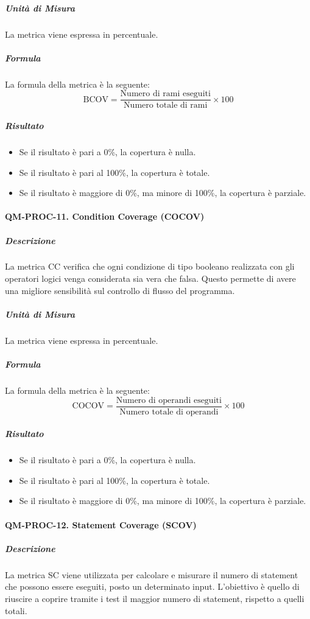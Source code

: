 				\subparagraph{Unità di Misura}
				La metrica viene espressa in percentuale.

				\subparagraph{Formula}
				La formula della metrica è la seguente:
				\[
					\text{BCOV} = \frac{\text{Numero di rami eseguiti}}{\text{Numero totale di rami}} \times 100
				\]

				\subparagraph{Risultato}
				\begin{itemize}
					\item Se il risultato è pari a 0\%, la copertura è nulla.
					\item Se il risultato è pari al 100\%, la copertura è totale.
					\item Se il risultato è maggiore di 0\%, ma minore di 100\%, la copertura è parziale.
				\end{itemize}

			\paragraph{QM-PROC-11. Condition Coverage (COCOV)}

				\subparagraph{Descrizione}
				La metrica CC verifica che ogni condizione di tipo booleano realizzata con gli operatori logici venga considerata sia vera che falsa. Questo permette di avere una migliore sensibilità sul controllo di flusso del programma.

				\subparagraph{Unità di Misura}
				La metrica viene espressa in percentuale.

				\subparagraph{Formula}
				La formula della metrica è la seguente:
				\[
					\text{COCOV} = \frac{\text{Numero di operandi eseguiti}}{\text{Numero totale di operandi}} \times 100
				\]

				\subparagraph{Risultato}
				\begin{itemize}
					\item Se il risultato è pari a 0\%, la copertura è nulla.
					\item Se il risultato è pari al 100\%, la copertura è totale.
					\item Se il risultato è maggiore di 0\%, ma minore di 100\%, la copertura è parziale.
				\end{itemize}


			\paragraph{QM-PROC-12. Statement Coverage (SCOV)}

			\subparagraph{Descrizione}
			La metrica SC viene utilizzata per calcolare e misurare il numero di statement che possono essere eseguiti, posto un determinato input. L'obiettivo è quello di riuscire a coprire tramite i test il maggior numero di statement, rispetto a quelli totali.

